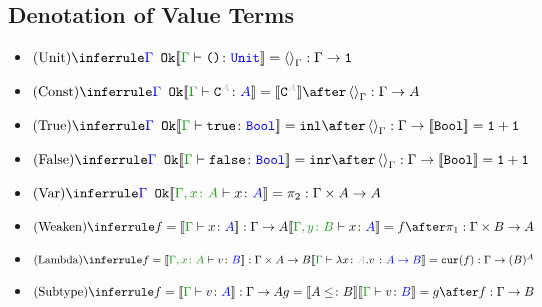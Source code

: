 \documentclass{report}
\begin{document}
\subsection{Denotation of Value Terms}
\begin{itemize}
    \item $\ntreeruleI{Unit}{\ok{\G}}{\deno{\typerelation{\G}{\u}{\U}} = \term{\G} : \G \rightarrow \1}$
        
    \item $\ntreeruleI{Const}{\ok{\G}}{\deno{\typerelation{\G}{\const{A}}{A}} = \deno{\const{A}} \after \term{\G} : \G \rightarrow A}$
         
    \item $\ntreeruleI{True}{\ok{\G}}{\deno{\typerelation{\G}{\t}{\B}} = \inl \after \term{\G} : \G \rightarrow \deno{\B} = \1+\1}$
        
    \item $\ntreeruleI{False}{\ok{\G}}{\deno{\typerelation{\G}{\f}{\B}} = \inr \after \term{\G} : \G \rightarrow \deno{\B} = \1+\1}$
        
    \item $\ntreeruleI{Var}{\ok{\G}}{\deno{\typerelation{\gax}{x}{A}} = \pp: \G \times A \rightarrow A}$
    \item $\ntreeruleI{Weaken}{f = \deno{\gtyperelation{x}{A}}: \G \rightarrow A}{\deno{\typerelation{\gby}{x}{A}} = f \after \p: \G \times B \rightarrow A}$
    \item $\ntreeruleI{Lambda}{f = \deno{\typerelation{\gax}{v}{B}} : \G \times A \rightarrow B}{\deno{\typerelation{\G}{\lam{x}{A}{v}}{A \rightarrow B}} = \cur{f} : \G \rightarrow (B)^A}$
    
    \item $\ntreeruleII{Subtype}{f = \deno{\typerelation{\G}{v}{A}} : \G \rightarrow A}{ g = \deno{A \subtype B}}{\deno{\typerelation{\G}{v}{B}} = g \after f : \G \rightarrow B}$
  
\end{itemize}
\end{document}
